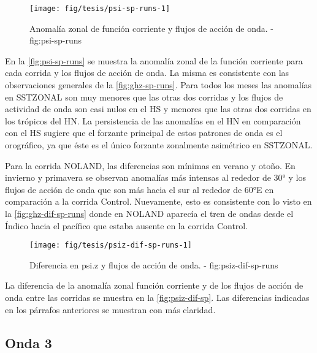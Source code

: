 \documentclass[spanish,a4paper,12p]{book}
\begin{document}
\begin{landscape}\begin{figure}

{\centering \texttt{[image: fig/tesis/psi-sp-runs-1]} 

}

\caption{Anomalía zonal de función corriente y flujos de acción de onda. - fig:psi-sp-runs}\label{fig:psi-sp-runs}
\end{figure}
\end{landscape}

En la \autoref{fig:psi-sp-runs} se muestra la anomalía zonal de la
función corriente para cada corrida y los flujos de acción de onda. La
misma es consistente con las observaciones generales de la
\autoref{fig:ghz-sp-runs}. Para todos los meses las anomalías en
SSTZONAL son muy menores que las otras dos corridas y los flujos de
actividad de onda son casi nulos en el HS y menores que las otras dos
corridas en los trópicos del HN. La persistencia de las anomalías en el
HN en comparación con el HS sugiere que el forzante principal de estos
patrones de onda es el orográfico, ya que éste es el único forzante
zonalmente asimétrico en SSTZONAL.

Para la corrida NOLAND, las diferencias son mínimas en verano y otoño.
En invierno y primavera se observan anomalías más intensas al rededor de
30° y los flujos de acción de onda que son más hacia el sur al rededor
de 60°E en comparación a la corrida Control. Nuevamente, esto es
consistente con lo visto en la \autoref{fig:ghz-dif-sp-runs} donde en
NOLAND aparecía el tren de ondas desde el Índico hacia el pacífico que
estaba ausente en la corrida Control.

\begin{figure*}
\texttt{[image: fig/tesis/psiz-dif-sp-runs-1]} \caption{Diferencia en psi.z y flujos de acción de onda. - fig:psiz-dif-sp-runs}\label{fig:psiz-dif-sp-runs}
\end{figure*}

La diferencia de la anomalía zonal función corriente y de los flujos de
acción de onda entre las corridas se muestra en la
\autoref{fig:psiz-dif-sp}. Las diferencias indicadas en los párrafos
anteriores se muestran con más claridad.


\subsection{Onda 3}\label{onda-3-2}
\end{document}
